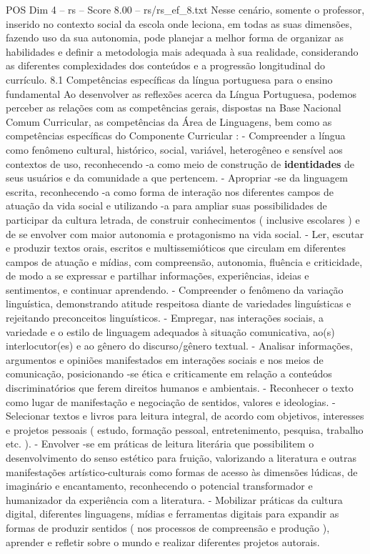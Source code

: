 \begin{textsample}{POS Dim 4 – rs – Score 8.00 – rs/rs\_ef\_8.txt}
Nesse cenário, somente o professor, inserido no contexto social da escola onde leciona, em todas as suas dimensões, fazendo uso da sua autonomia, pode planejar a melhor forma de organizar as habilidades e definir a metodologia mais adequada à sua realidade, considerando as diferentes complexidades dos conteúdos e a progressão longitudinal do currículo. 8.1 Competências específicas da língua portuguesa para o ensino fundamental Ao desenvolver as reflexões acerca da Língua Portuguesa, podemos perceber as relações com as competências gerais, dispostas na Base Nacional Comum Curricular, as competências da Área de Linguagens, bem como as competências específicas do Componente Curricular : - Compreender a língua como fenômeno cultural, histórico, social, variável, heterogêneo e sensível aos contextos de uso, reconhecendo -a como meio de construção de \textbf{identidades} de seus usuários e da comunidade a que pertencem. - Apropriar -se da linguagem escrita, reconhecendo -a como forma de interação nos diferentes campos de atuação da vida social e utilizando -a para ampliar suas possibilidades de participar da cultura letrada, de construir conhecimentos ( inclusive escolares ) e de se envolver com maior autonomia e protagonismo na vida social. - Ler, escutar e produzir textos orais, escritos e multissemióticos que circulam em diferentes campos de atuação e mídias, com compreensão, autonomia, fluência e criticidade, de modo a se expressar e partilhar informações, experiências, ideias e sentimentos, e continuar aprendendo. - Compreender o fenômeno da variação linguística, demonstrando atitude respeitosa diante de variedades linguísticas e rejeitando preconceitos linguísticos. - Empregar, nas interações sociais, a variedade e o estilo de linguagem adequados à situação comunicativa, ao(s) interlocutor(es) e ao gênero do discurso/gênero textual. - Analisar informações, argumentos e opiniões manifestados em interações sociais e nos meios de comunicação, posicionando -se ética e criticamente em relação a conteúdos discriminatórios que ferem direitos humanos e ambientais. - Reconhecer o texto como lugar de manifestação e negociação de sentidos, valores e ideologias. - Selecionar textos e livros para leitura integral, de acordo com objetivos, interesses e projetos pessoais ( estudo, formação pessoal, entretenimento, pesquisa, trabalho etc. ). - Envolver -se em práticas de leitura literária que possibilitem o desenvolvimento do senso estético para fruição, valorizando a literatura e outras manifestações artístico-culturais como formas de acesso às dimensões lúdicas, de imaginário e encantamento, reconhecendo o potencial transformador e humanizador da experiência com a literatura. - Mobilizar práticas da cultura digital, diferentes linguagens, mídias e ferramentas digitais para expandir as formas de produzir sentidos ( nos processos de compreensão e produção ), aprender e refletir sobre o mundo e realizar diferentes projetos autorais.

\end{textsample}
